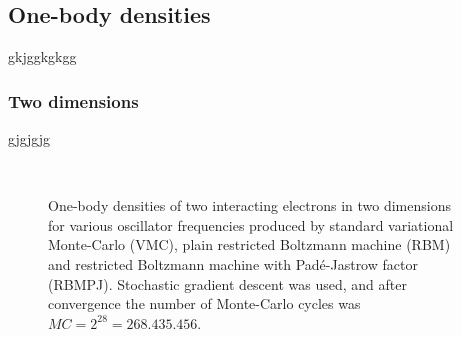\subsection{One-body densities}
gkjggkgkgg
\subsubsection{Two dimensions}
gjgjgjg

\begin{figure} [H]%
	\centering
	\\
	
	\caption{One-body densities of two interacting electrons in two dimensions for various oscillator frequencies produced by standard variational Monte-Carlo (VMC), plain restricted Boltzmann machine (RBM) and restricted Boltzmann machine with Padé-Jastrow factor (RBMPJ). Stochastic gradient descent was used, and after convergence the number of Monte-Carlo cycles was $MC=2^{28}=268.435.456$.}%
	\label{fig:OB_interaction_2P_2D}
\end{figure}

